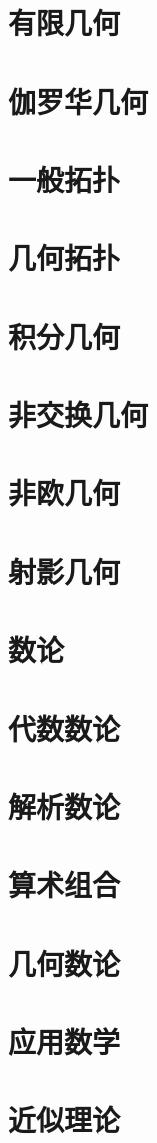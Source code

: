 \documentclass[UTF8]{NatureUniverse}
\begin{document}
\section{有限几何}
\section{伽罗华几何}
\section{一般拓扑}
\section{几何拓扑}
\section{积分几何}
\section{非交换几何}
\section{非欧几何}
\section{射影几何}
\section{数论}
\section{代数数论}
\section{解析数论}
\section{算术组合}
\section{几何数论}
\section{应用数学}
\section{近似理论}
\end{document}
